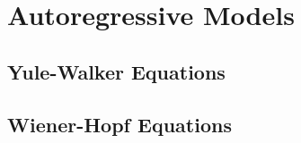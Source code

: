 \chapter{Autoregressive Models}
\label{appendix:ar_models}


\section{Yule-Walker Equations}
\label{appendix:yule_walker_equations}


\section{Wiener-Hopf Equations}
\label{appendix:wiener_hopf_equations}

